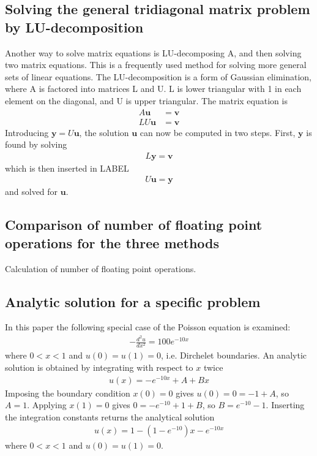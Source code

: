 \documentclass[a4paper,11pt, english, twoside]{article}
\begin{document}
\subsection{Solving the general tridiagonal matrix problem by LU-decomposition}
Another way to solve matrix equations is LU-decomposing A, and then solving
two matrix equations. This is a frequently used method for solving more general
sets of linear equations. The LU-decomposition is a form of Gaussian elimination,
where A is factored into matrices L and U. L is lower triangular with 1 in each
element on the diagonal, and U is upper triangular. The matrix equation is
\begin{align*}
  A\mathbf{u} &= \mathbf{v} \\
  LU \mathbf{u} &= \mathbf{v}
\end{align*}
Introducing $\mathbf{y} = U\mathbf{u}$, the solution $\mathbf{u}$ can now be
computed in two steps. First, $\mathbf{y}$ is found by solving
\begin{align*}
  L\mathbf{y} = \mathbf{v}
\end{align*}
which is then inserted in LABEL
\begin{align*}
  U\mathbf{u} = \mathbf{y}
\end{align*}
and solved for $\mathbf{u}$.

\subsection{Comparison of number of floating point operations for the three methods}
Calculation of number of floating point operations.

\subsection{Analytic solution for a specific problem}
In this paper the following special case of the Poisson equation is examined:
\begin{align}
  - \frac{d^2 u}{dx^2} = 100 e^{-10x}
\end{align}
where $0 < x < 1$ and $u(0) = u(1) = 0$, i.e. Dirchelet boundaries. An analytic
solution is obtained by integrating with respect to $x$ twice
\begin{align*}
  u(x) = -e^{-10x} + A + Bx
\end{align*}
Imposing the boundary condition $x(0) = 0$ gives $u(0) = 0 = -1 + A$, so
$A = 1$. Applying $x(1) = 0$ gives $0 = -e^{-10} + 1 + B$, so $B = e^{-10} - 1$.
Inserting the integration constants returns the analytical solution
\begin{align}
  u(x) = 1 - (1 - e^{-10})x - e^{-10x}
\end{align}
where $0 < x < 1$ and $u(0) = u(1) = 0$.
\end{document}

